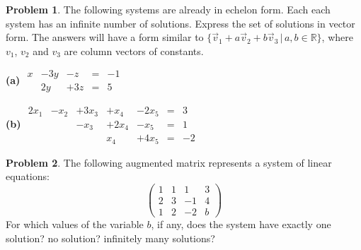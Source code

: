 \documentclass[11pt]{article}
\newcommand{\R}{{\mathbb R}}
\theoremstyle{definition}
\newtheorem{problem}{Problem}
\newenvironment{answer}{\bgroup\color{blue}}{\egroup}
\begin{document}
\bigskip

\begin{problem} 
The following systems are already in echelon form.  Each each system has an 
infinite number of solutions.  Express the set of solutions in vector form.  The answers
will have a form similar to $\{\vec v_1 + a\vec v_2 + b\vec v_3 \,|\, a,b\in\R\}$,
where $v_1$, $v_2$ and $v_3$ are column vectors of constants.

\bigskip

\textbf{(a)} \qquad
    $\begin{matrix}
       x & -3y &  -z & = & -1 \\
         &  2y & +3z & = & 5
    \end{matrix}$

\bigskip\bigskip

\textbf{(b)} \qquad
    $\begin{matrix}
       2x_1 &  -x_2 & +3x_3 &  +x_4 & -2x_5 &  = & 3 \\
            &       &  -x_3 & +2x_4 &  -x_5 &  = & 1 \\
            &       &       &   x_4 & +4x_5 &  = & -2
    \end{matrix}$

\end{problem}
\begin{answer}
\end{answer}

\bigskip

\begin{problem}
The following augmented matrix represents a system of linear equations:
$$\left(\begin{array}{ccc|c}
          1 & 1 & 1 & 3\\
          2 & 3 & -1 & 4\\ 
          1 & 2 & -2 & b 
\end{array}\right)$$
For which values of the variable $b$, if any, does the system have
exactly one solution? no solution? infinitely many solutions?
\end{problem}
\begin{answer}
\end{answer}
\end{document}
